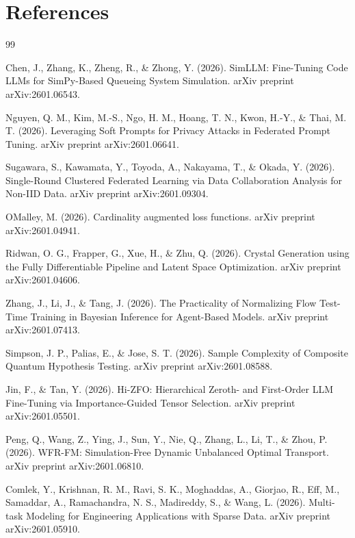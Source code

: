 \documentclass{article}
\begin{document}
\section{References}

\begin{thebibliography}{99}

Chen, J., Zhang, K., Zheng, R., \& Zhong, Y. (2026). SimLLM: Fine-Tuning Code LLMs for SimPy-Based Queueing System Simulation. arXiv preprint arXiv:2601.06543.

Nguyen, Q. M., Kim, M.-S., Ngo, H. M., Hoang, T. N., Kwon, H.-Y., \& Thai, M. T. (2026). Leveraging Soft Prompts for Privacy Attacks in Federated Prompt Tuning. arXiv preprint arXiv:2601.06641.

Sugawara, S., Kawamata, Y., Toyoda, A., Nakayama, T., \& Okada, Y. (2026). Single-Round Clustered Federated Learning via Data Collaboration Analysis for Non-IID Data. arXiv preprint arXiv:2601.09304.

OMalley, M. (2026). Cardinality augmented loss functions. arXiv preprint arXiv:2601.04941.

Ridwan, O. G., Frapper, G., Xue, H., \& Zhu, Q. (2026). Crystal Generation using the Fully Differentiable Pipeline and Latent Space Optimization. arXiv preprint arXiv:2601.04606.

Zhang, J., Li, J., \& Tang, J. (2026). The Practicality of Normalizing Flow Test-Time Training in Bayesian Inference for Agent-Based Models. arXiv preprint arXiv:2601.07413.

Simpson, J. P., Palias, E., \& Jose, S. T. (2026). Sample Complexity of Composite Quantum Hypothesis Testing. arXiv preprint arXiv:2601.08588.

Jin, F., \& Tan, Y. (2026). Hi-ZFO: Hierarchical Zeroth- and First-Order LLM Fine-Tuning via Importance-Guided Tensor Selection. arXiv preprint arXiv:2601.05501.

Peng, Q., Wang, Z., Ying, J., Sun, Y., Nie, Q., Zhang, L., Li, T., \& Zhou, P. (2026). WFR-FM: Simulation-Free Dynamic Unbalanced Optimal Transport. arXiv preprint arXiv:2601.06810.

Comlek, Y., Krishnan, R. M., Ravi, S. K., Moghaddas, A., Giorjao, R., Eff, M., Samaddar, A., Ramachandra, N. S., Madireddy, S., \& Wang, L. (2026). Multi-task Modeling for Engineering Applications with Sparse Data. arXiv preprint arXiv:2601.05910.


\end{thebibliography}
\end{document}
